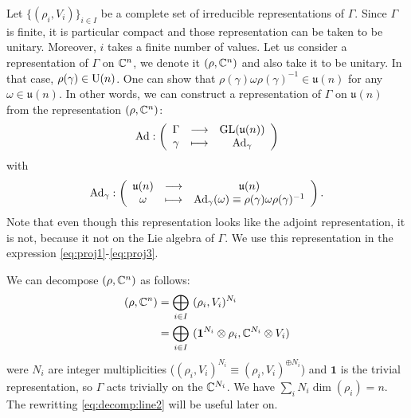 \documentclass[a4paper,11pt]{article}
\begin{document}
        Let $\{(\rho_i,V_i)\}_{i\in I}$ be a complete set of irreducible representations of $\Gamma$. Since $\Gamma$ is finite, it is particular compact and those representation can be taken to be unitary. Moreover, $i$ takes a finite number of values. Let us consider a representation of $\Gamma$ on $\mathbb{C}^n$, we denote it $(\rho,\mathbb{C}^n)$ and also take it to be unitary. In that case, $\rho(\gamma)\in\text{U}(n)$. One can show that $\rho(\gamma)\omega\rho(\gamma)^{-1}\in\mathfrak{u}(n)$ for any $\omega\in\mathfrak{u}(n)$. In other words, we can construct a representation of $\Gamma$ on $\mathfrak{u}(n)$ from the representation $(\rho,\mathbb{C}^n)$:
        \begin{equation}
            \text{Ad}:\left(
            \begin{array}{ccc}
                \Gamma & \longrightarrow & \text{GL}(\mathfrak{u}(n)) \\
                \gamma & \longmapsto & \text{Ad}_\gamma
            \end{array}
            \right)
        \end{equation}
        with
        \begin{equation}
            \text{Ad}_\gamma:\left(
            \begin{array}{ccc}
                \mathfrak{u}(n) & \longrightarrow & \mathfrak{u}(n) \\
                \omega & \longmapsto & \text{Ad}_\gamma(\omega)\equiv\rho(\gamma)\omega\rho(\gamma)^{-1}
            \end{array}
            \right).
        \end{equation}
        Note that even though this representation looks like the adjoint representation, it is not, because it not on the Lie algebra of $\Gamma$. We use this representation in the expression \eqref{eq:proj1}-\eqref{eq:proj3}.

        We can decompose $(\rho,\mathbb{C}^n)$ as follows:
        \begin{align}
            (\rho,\mathbb{C}^n) &= \bigoplus_{i\in I}~(\rho_i,V_i)^{N_i} \\
            &= \bigoplus_{i\in I}~(\boldsymbol{1}^{N_i}\otimes\rho_i,\mathbb{C}^{N_i}\otimes V_i) \label{eq:decomp:line2}
        \end{align}
        were $N_i$ are integer multiplicities ($(\rho_i,V_i)^{N_i}\equiv(\rho_i,V_i)^{\oplus N_i}$) and $\boldsymbol{1}$ is the trivial representation, so $\Gamma$ acts trivially on the $\mathbb{C}^{N_i}$. We have $\sum_iN_i\dim(\rho_i)=n$. The rewritting \eqref{eq:decomp:line2} will be useful later on.
        
\end{document}
